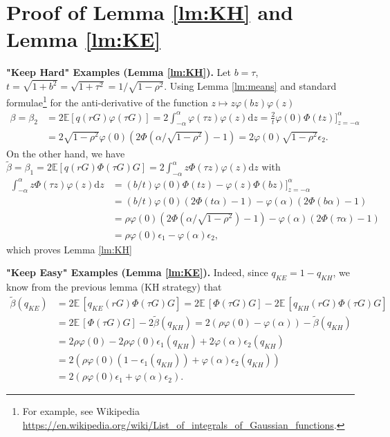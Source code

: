 \section{Proof of Lemma \ref{lm:KH} and Lemma \ref{lm:KE}}
\textbf {"Keep Hard" Examples (Lemma \ref{lm:KH}).}
Let $b=\tau$, $t=\sqrt{1+b^2}=\sqrt{1+\tau^2}=1/\sqrt{1-\rho^2}$. Using Lemma \ref{lm:means} and standard formulae\footnote{For example, see Wikipedia \url{https://en.wikipedia.org/wiki/List_of_integrals_of_Gaussian_functions}.} for the anti-derivative of the function $z \mapsto z\varphi(bz)\varphi(z)$
\begin{align*}
\beta = \beta_2 &= 2\mathbb E\left[q(rG)\varphi(\tau G)\right] = 2\int_{-\alpha}^\alpha \varphi(\tau z)\varphi(z)\mathrm dz = \frac{2}{t}\varphi(0)\Phi(tz)\bigg]_{z=-\alpha}^\alpha\\
&= 2\sqrt{1-\rho^2} \varphi(0)\left(2\Phi(\alpha/\sqrt{1-\rho^2})-1\right) =2\varphi(0)\sqrt{1-\rho^2}\epsilon_2.
\end{align*}
On the other hand, we have $\tilde\beta = \beta_1 = 2\mathbb E\left[q(rG)\Phi (\tau G)G\right] = 2\int_{-\alpha}^\alpha z\Phi(\tau z)\varphi(z)\mathrm d z$ with
\begin{align*}
\int_{-\alpha}^\alpha z\Phi(\tau z)\varphi(z)\mathrm d z %
&= (b/t)\varphi(0)\Phi(tz) -\varphi(z)\Phi(bz)\bigg]_{z=-\alpha}^\alpha \\
&=(b/t)\varphi(0)(2\Phi(t\alpha)-1) - \varphi(\alpha)(2\Phi(b\alpha)-1)\\
&= \rho\varphi(0)(2\Phi(\alpha/\sqrt{1-\rho^2})-1)-\varphi(\alpha)(2\Phi(\tau \alpha)-1)\\
&= \rho\varphi(0)\epsilon_1-\varphi(\alpha)\epsilon_2,
\end{align*}
which proves Lemma \ref{lm:KH}

\textbf{"Keep Easy" Examples (Lemma \ref{lm:KE}).}
Indeed, since $q_{KE} = 1-q_{KH}$, we know from the previous lemma (KH strategy) that
\begin{align*}
    \tilde \beta(q_{KE}) &= 2\mathbb E\,[q_{KE}(rG)\Phi(\tau G)G] = 2\mathbb E\,[\Phi(\tau G)G]-2\mathbb E\,[q_{KH}(rG)\Phi(\tau G)G]\\
    &= 2\mathbb E\,[\Phi(\tau G)G]-2\tilde \beta(q_{KH}) = 2(\rho\varphi(0)-\varphi(\alpha))-\tilde \beta(q_{KH})\\
    &= 2\rho\varphi(0)-2\rho \varphi(0)\epsilon_1(q_{KH})+2\varphi(\alpha)\epsilon_2(q_{KH})\\
    &= 2(\rho\varphi(0)(1-\epsilon_1(q_{KH}))+\varphi(\alpha)\epsilon_2(q_{KH}))\\
    &= 2(\rho\varphi(0)\epsilon_1 + \varphi(\alpha)\epsilon_2).
\end{align*}

